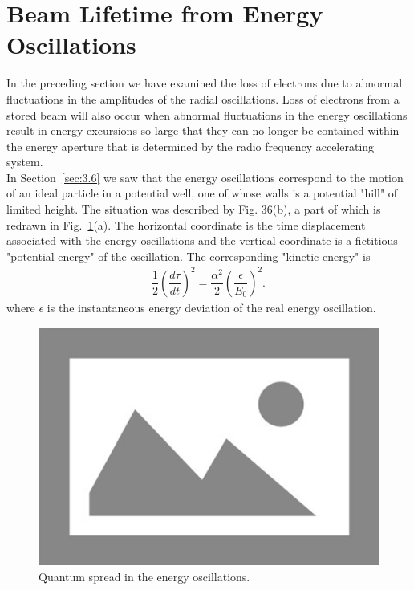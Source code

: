 \section{Beam Lifetime from Energy Oscillations} \label{eq:5.8}

In the preceding section we have examined the loss of electrons due to abnormal fluctuations in the amplitudes of the radial oscillations. Loss of electrons from a stored beam will also occur when abnormal fluctuations in the energy oscillations result in energy excursions so large that they can no longer be contained within the energy aperture that is determined by the radio frequency accelerating system.\\
In Section~\ref{sec:3.6} we saw that the energy oscillations correspond to the motion of an ideal particle in a potential well, one of whose walls is a potential "hill" of limited height. The situation was described by Fig. 36(b), a part of which is redrawn in Fig.~\ref{fig:fig48}(a). The horizontal coordinate is the time displacement associated with the energy oscillations and the vertical coordinate is a fictitious "potential energy" of the oscillation. The corresponding "kinetic energy" is
\begin{align} \label{eq:5.131}
	\dfrac{1}{2}\left( \dfrac{d\tau}{dt} \right)^2 = \dfrac{\alpha^2}{2} \left( \dfrac{\epsilon}{E_0} \right)^2.
\end{align}
where $\epsilon$ is the instantaneous energy deviation of the real energy oscillation.

\begin{figure}[!htb]
	\centering
	\includegraphics[width=0.8\linewidth]{./Figuras/placeholder.png}
	\caption{Quantum spread in the energy oscillations.}
	\label{fig:fig48}
\end{figure}

